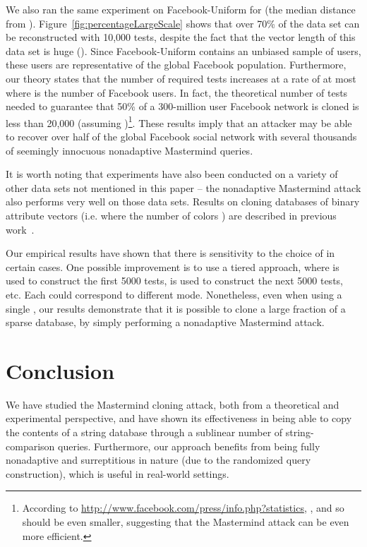 \documentclass{article}
\begin{document}
We also ran the same experiment on Facebook-Uniform for  (the median distance from ). Figure~\ref{fig:percentageLargeScale} shows that over 70\% of the data set can be reconstructed with 10,000 tests, despite the fact
that the vector length of this data set is huge ().   Since Facebook-Uniform contains an unbiased sample of 
users, these users are representative of the global Facebook population.  Furthermore, our theory states that
the number of required tests increases at a rate of at most  where  is the number of Facebook users.  In fact, the theoretical
number of tests needed to guarantee that 50\% of a 300-million user Facebook network is cloned is less
than 20,000 (assuming
)\footnote{According to \url{http://www.facebook.com/press/info.php?statistics}, , and so 
 should be even smaller, suggesting that the Mastermind attack can be even more efficient.}.  These results imply that an attacker may be able to recover 
over half of the global Facebook social network with several thousands of seemingly
innocuous nonadaptive Mastermind queries.  

It is worth noting that experiments have also been conducted on a variety of other data sets not
mentioned in this paper -- the nonadaptive Mastermind attack also performs 
very well on those data sets.  Results on cloning databases of binary attribute 
vectors (i.e. where the number of colors ) are described in previous work~\cite{AsuncionGoodrich2010}.

Our empirical results have shown that there is sensitivity to the choice of  in certain cases. 
One possible improvement 
is to use a tiered approach, where  is used to construct the first 5000 tests, 
 is used to construct the next 5000 tests, etc.   Each  could correspond 
to different mode.  Nonetheless, even when using a single , our results 
demonstrate that it is possible to clone a large fraction of a sparse 
database, by simply performing a nonadaptive Mastermind attack.

\section{Conclusion}
We have studied the Mastermind cloning attack, both from a
theoretical and experimental perspective, and have shown its
effectiveness in being able to copy the contents of a string database
through a sublinear number of string-comparison queries.  Furthermore, our
approach benefits from being fully nonadaptive and surreptitious in nature 
(due to the randomized
query construction), which is useful in real-world settings.
\end{document}
